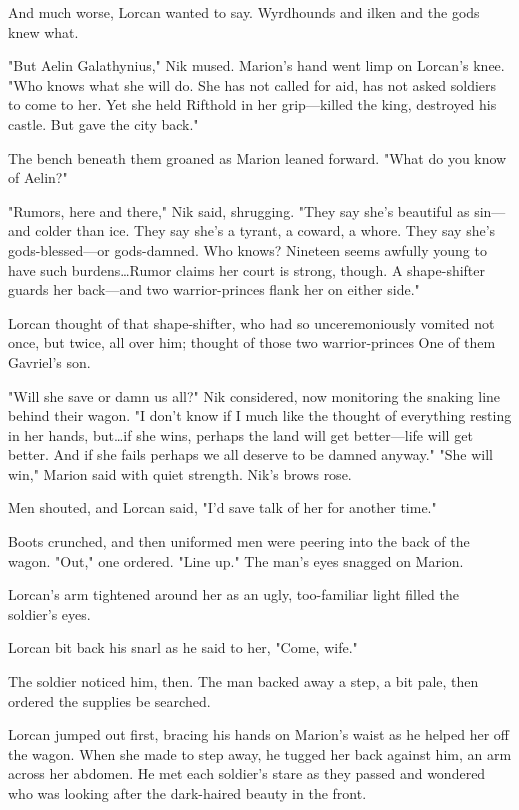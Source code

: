 And much worse, Lorcan wanted to say.
Wyrdhounds and ilken and the gods knew what.

"But Aelin Galathynius," Nik mused.
Marion's hand went limp on Lorcan's knee.
"Who knows what she will do.
She has not called for aid, has not asked soldiers to come to her.
Yet she held Rifthold in her grip---killed the king, destroyed his castle.
But gave the city back."

The bench beneath them groaned as Marion leaned forward.
"What do you know of Aelin?"

"Rumors, here and there," Nik said, shrugging.
"They say she's beautiful as sin---and colder than ice.
They say she's a tyrant, a coward, a whore.
They say she's gods-blessed---or gods-damned.
Who knows?
Nineteen seems awfully young to have such burdens\ldots Rumor claims her court is strong, though.
A shape-shifter guards her back---and two warrior-princes flank her on either side."

Lorcan thought of that shape-shifter, who had so unceremoniously vomited not once, but twice, all over him; thought of those two warrior-princes  One of them Gavriel's son.

"Will she save or damn us all?"
Nik considered, now monitoring the snaking line behind their wagon.
"I don't know if I much like the thought of everything resting in her hands, but\ldots if she wins, perhaps the land will get better---life will get better.
And if she fails 
perhaps we all deserve to be damned anyway."
"She will win," Marion said with quiet strength.
Nik's brows rose.

Men shouted, and Lorcan said, "I'd save talk of her for another time."

Boots crunched, and then uniformed men were peering into the back of the wagon.
"Out," one ordered.
"Line up."
The man's eyes snagged on Marion.

Lorcan's arm tightened around her as an ugly, too-familiar light filled the soldier's eyes.

Lorcan bit back his snarl as he said to her, "Come, wife."

The soldier noticed him, then.
The man backed away a step, a bit pale, then ordered the supplies be searched.

Lorcan jumped out first, bracing his hands on Marion's waist as he helped her off the wagon.
When she made to step away, he tugged her back against him, an arm across her abdomen.
He met each soldier's stare as they passed and wondered who was looking after the dark-haired beauty in the front.

